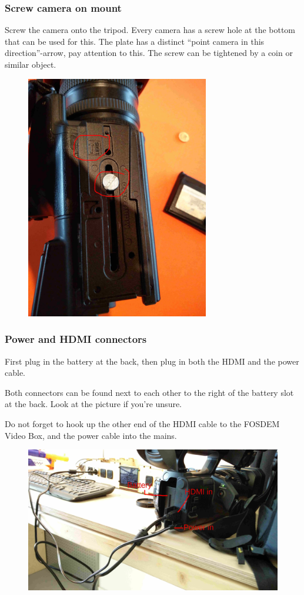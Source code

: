 \documentclass{article}
\begin{document}
\subsubsection{Screw camera on mount}
Screw the camera onto the tripod. Every camera has a screw hole at the bottom that can be used for this. The plate has a distinct ``point camera in this direction''-arrow, pay attention to this. The screw can be tightened by a coin or similar object.

\begin{figure}[H]
  \centering
  \includegraphics[width = 80mm]{Cam00.jpg}
\end{figure}

\subsubsection{Power and HDMI connectors}
First plug in the battery at the back, then plug in both the HDMI and the power cable.

Both connectors can be found next to each other to the right of the battery slot at the back.
Look at the picture if you're unsure.

Do not forget to hook up the other end of the HDMI cable to the FOSDEM Video Box, and the power cable into the mains.

\begin{figure}[H]
  \centering
\includegraphics[width = 120mm]{Sony01.jpg}
\end{figure}
\end{document}
